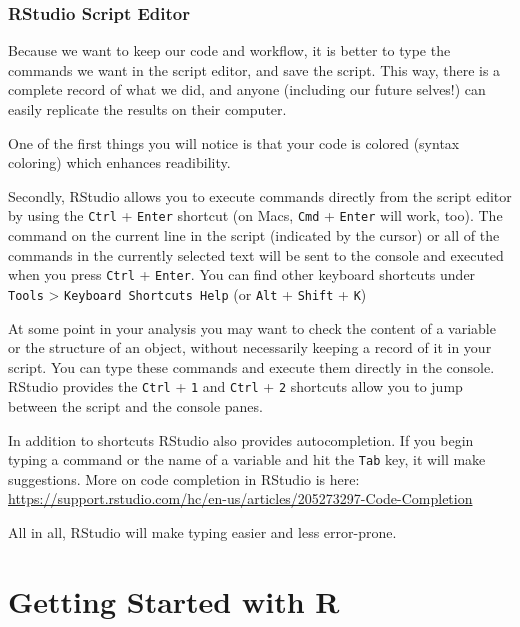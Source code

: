\documentclass[]{book}
\theoremstyle{definition}
\theoremstyle{definition}
\theoremstyle{definition}
\theoremstyle{remark}
\begin{document}
\subsection{RStudio Script Editor}\label{rstudio-script-editor}

Because we want to keep our code and workflow, it is better to type the
commands we want in the script editor, and save the script. This way,
there is a complete record of what we did, and anyone (including our
future selves!) can easily replicate the results on their computer.

One of the first things you will notice is that your code is colored
(syntax coloring) which enhances readibility.

Secondly, RStudio allows you to execute commands directly from the
script editor by using the \texttt{Ctrl} + \texttt{Enter} shortcut (on
Macs, \texttt{Cmd} + \texttt{Enter} will work, too). The command on the
current line in the script (indicated by the cursor) or all of the
commands in the currently selected text will be sent to the console and
executed when you press \texttt{Ctrl} + \texttt{Enter}. You can find
other keyboard shortcuts under \texttt{Tools} \textgreater{}
\texttt{Keyboard\ Shortcuts\ Help} (or \texttt{Alt} + \texttt{Shift} +
\texttt{K})

At some point in your analysis you may want to check the content of a
variable or the structure of an object, without necessarily keeping a
record of it in your script. You can type these commands and execute
them directly in the console. RStudio provides the \texttt{Ctrl} +
\texttt{1} and \texttt{Ctrl} + \texttt{2} shortcuts allow you to jump
between the script and the console panes.

In addition to shortcuts RStudio also provides autocompletion. If you
begin typing a command or the name of a variable and hit the
\texttt{Tab} key, it will make suggestions. More on code completion in
RStudio is here:
\url{https://support.rstudio.com/hc/en-us/articles/205273297-Code-Completion}

All in all, RStudio will make typing easier and less error-prone.

\chapter{Getting Started with R}\label{gettingstarted}
\end{document}
